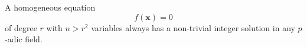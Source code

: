 \begin{conjecture}
    A homogeneous equation
\[
    f(\mathbf{x})=0
\]
    of degree $r$ with $n>r^2$ variables always has a non-trivial integer solution in any $p$-adic field.
\end{conjecture}
